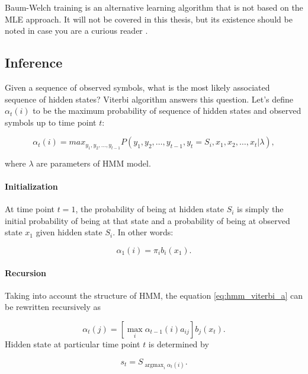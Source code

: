 \documentclass[thesis=B,english]{FITthesis}[2012/06/26]
\DeclareMathOperator*{\argmax}{argmax} %
\begin{document}
Baum-Welch training is an alternative learning algorithm that is not based on the MLE approach. It will not be covered in this thesis, but its existence should be noted in case you are a curious reader \cite{hmm-lawrence}.

\subsection{Inference}

Given a sequence of observed symbols, what is the most likely associated sequence of hidden states? Viterbi algorithm answers this question. Let's define $\alpha_t(i)$ to be the maximum probability of sequence of hidden states and observed symbols up to time point $t$:

\begin{equation} \label{eq:hmm_viterbi_a}
\alpha_t(i) = max_{y_1,y_2,\dots,y_{t-1}} P(y_1,y_2,\dots,y_{t-1},y_t = S_i,x_1,x_2,\dots,x_t | \lambda),
\end{equation}

where $\lambda$ are parameters of HMM model.

\paragraph{Initialization}

At time point $t=1$, the probability of being at hidden state $S_i$ is simply the initial probability of being at that state and a probability of being at observed state $x_1$ given hidden state $S_i$. In other words:

\begin{equation*}
\alpha_1(i) = \pi_i b_i(x_1).
\end{equation*}

\paragraph{Recursion}
Taking into account the structure of HMM, the equation \ref{eq:hmm_viterbi_a} can be rewritten recursively as

\begin{equation} \label{eq:hmm_viterbi_a_rec}
\alpha_t(j) = [\max_i \alpha_{t-1}(i)a_{ij}] b_j(x_t).
\end{equation}
Hidden state at particular time point $t$ is determined by

\begin{equation*}
s_t = S_{\argmax_i \alpha_{t}(i)}.
\end{equation*}
\end{document}
